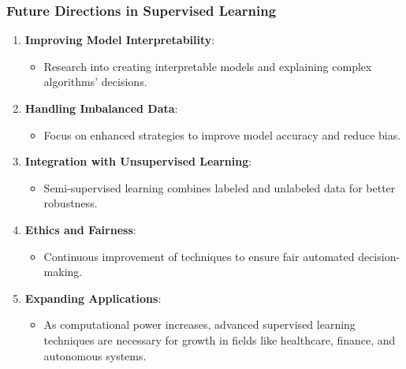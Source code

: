 \documentclass[aspectratio=169]{beamer}
\begin{document}
\begin{frame}[fragile]
    \frametitle{Future Directions in Supervised Learning}

    \begin{enumerate}
        \item \textbf{Improving Model Interpretability}:
        \begin{itemize}
            \item Research into creating interpretable models and explaining complex algorithms' decisions.
        \end{itemize}
        
        \item \textbf{Handling Imbalanced Data}:
        \begin{itemize}
            \item Focus on enhanced strategies to improve model accuracy and reduce bias.
        \end{itemize}

        \item \textbf{Integration with Unsupervised Learning}:
        \begin{itemize}
            \item Semi-supervised learning combines labeled and unlabeled data for better robustness.
        \end{itemize}

        \item \textbf{Ethics and Fairness}:
        \begin{itemize}
            \item Continuous improvement of techniques to ensure fair automated decision-making.
        \end{itemize}

        \item \textbf{Expanding Applications}:
        \begin{itemize}
            \item As computational power increases, advanced supervised learning techniques are necessary for growth in fields like healthcare, finance, and autonomous systems.
        \end{itemize}
    \end{enumerate}
\end{frame}
\end{document}
